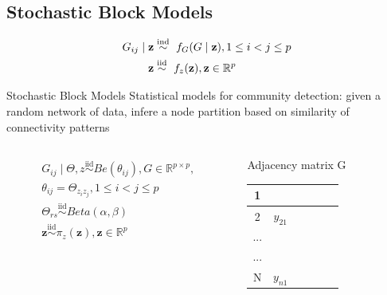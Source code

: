 \subsection{Stochastic Block Models}

\begin{align*}
    G_{ij} \mid \mathbf{z} &\ind\  f_{G}(G \mid \mathbf{z}) , 1 \le i < j \le p \\ %
    \mathbf{z} &\iid\ f_{z}(\mathbf{z}), \mathbf{z} \in \mathbb{R}^p
\end{align*}


\begin{frame}{Stochastic Block Models}
    Statistical models for \alert{community detection}: given a random network of data, infere a node partition based on similarity of connectivity patterns\\

    \begin{columns}
        \begin{column}{0.30\textwidth}
            \begin{align*}
                G_{ij} \mid \Theta,z \overset{\mathrm{iid}}{\sim} Be(\theta_{ij}),  G \in \mathbb{R}^{p \times p}, \\
                \theta_{ij} = \Theta_{z_{i}z_{j}}, 1 \le i < j \le p \\ 
                \Theta_{rs} \overset{\mathrm{iid}}{\sim} Beta(\alpha, \beta)\\
                \mathbf{z} \overset{\mathrm{iid}}{\sim} \pi_{z}(\mathbf{z}), \mathbf{z} \in \mathbb{R}^p
            \end{align*}
            \end{column}
        \begin{column}{0.30\textwidth}
            \alert{Adjacency matrix G}
            \begin{table}[htpb]
            \centering
            \begin{tabular}{c|c|c|c|c|c|} 
            \hline
            1   & &    &    &   &     \\ 
            \hline
            2  &  $y_{21}$ &    &    &   &     \\ 
            \hline
            ...  &   &    &    &   &     \\ 
            \hline
            ...  &   &    &    &   &     \\ 
            \hline
            N  & $y_{n1}$   &    &    &   &  
            \end{tabular}
            \end{table}
        \end{column}



\end{columns}
\end{frame}

